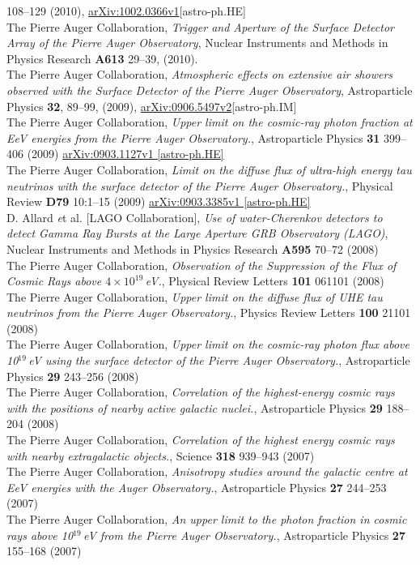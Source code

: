 \documentclass[11pt, a4paper]{article}
\newcommand{\years}[1]{\marginnote{\scriptsize #1}}
\begin{document}
108--129 (2010),
\href{http://arxiv.org/abs/0907.4282}{arXiv:1002.0366v1}[astro-ph.HE]\\
\years{2010}The Pierre Auger Collaboration, {\emph{Trigger and Aperture of the
Surface Detector Array of the Pierre Auger Observatory}}, Nuclear Instruments
and Methods in Physics Research {\bf A613} 29--39, (2010).\\
\years{2009} The Pierre Auger Collaboration, {\emph{Atmospheric effects on
extensive air showers observed with the Surface Detector of the Pierre Auger
Observatory}}, Astroparticle Physics {\bf 32}, 89--99, (2009),
\href{http://arxiv.org/abs/0906.5497/}{arXiv:0906.5497v2}[astro-ph.IM]\\
\years{2009}The Pierre Auger Collaboration, {\emph{Upper limit on the
cosmic-ray photon fraction at EeV energies from the Pierre Auger
Observatory.}}, Astroparticle Physics {\bf 31} 399--406 (2009)
\href{http://arxiv.org/abs/0903.1127/}{arXiv:0903.1127v1 [astro-ph.HE]}\\
\years{2009}The Pierre Auger Collaboration, {\emph{Limit on the diffuse flux of
ultra-high energy tau neutrinos with the surface detector of the Pierre Auger
Observatory.}}, Physical Review {\bf D79} 10:1--15 (2009)
\href{http://arxiv.org/abs/0903.3385/}{arXiv:0903.3385v1 [astro-ph.HE]}\\
\years{2008}D. Allard {\emph et al.} [LAGO Collaboration], {\emph{Use of
water-Cherenkov detectors to detect Gamma Ray Bursts at the Large Aperture GRB
Observatory (LAGO)}}, Nuclear Instruments and Methods in Physics Research {\bf
A595} 70--72 (2008)\\
\years{2008}The Pierre Auger Collaboration, {\emph{Observation of the
Suppression of the Flux of Cosmic Rays above $4\times10^{19}$\,eV.}},
Physical Review Letters {\bf 101} 061101 (2008)\\
\years{2008}The Pierre Auger Collaboration, {\emph{Upper limit on the diffuse
flux of UHE tau neutrinos from the Pierre Auger Observatory.}}, Physics Review
Letters {\bf 100} 21101 (2008)\\
\years{2008}The Pierre Auger Collaboration, {\emph{Upper limit on the
cosmic-ray photon flux above 10$^{19}$\,eV using the surface detector of the
Pierre Auger Observatory.}}, Astroparticle Physics {\bf 29} 243--256 (2008)\\
\years{2008}The Pierre Auger Collaboration, {\emph{Correlation of the
highest-energy cosmic rays with the positions of nearby active galactic
nuclei.}}, Astroparticle Physics {\bf 29} 188--204 (2008)\\
\years{2007}The Pierre Auger Collaboration, {\emph{Correlation of the highest
energy cosmic rays with nearby extragalactic objects.}}, Science {\bf 318}
939--943 (2007)\\
\years{2007}The Pierre Auger Collaboration, {\emph{Anisotropy studies around
the galactic centre at EeV energies with the Auger Observatory.}}, 
Astroparticle Physics {\bf 27} 244--253 (2007)\\
\years{2007}The Pierre Auger Collaboration, {\emph{An upper limit to the photon
fraction in cosmic rays above 10$^{19}$\,eV from the Pierre Auger
Observatory.}}, Astroparticle Physics {\bf 27} 155--168 (2007)\\
\end{document}
